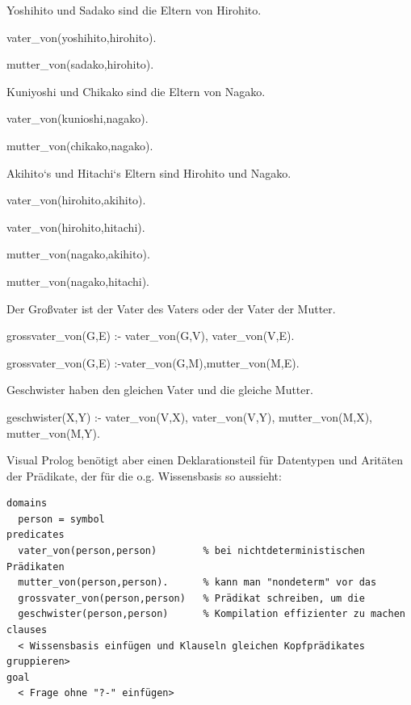 \documentclass[a4paper]{article}
\begin{document}
\begin{multicols}{3}
  \begin{itemize*}
    \itemsep1pt\parskip0pt
    \item
          Yoshihito und Sadako sind die Eltern von Hirohito.
    \item
          vater\_von(yoshihito,hirohito).
    \item
          mutter\_von(sadako,hirohito).
    \item
          Kuniyoshi und Chikako sind die Eltern von Nagako.
    \item
          vater\_von(kunioshi,nagako).
    \item
          mutter\_von(chikako,nagako).
    \item
          Akihito`s und Hitachi`s Eltern sind Hirohito und Nagako.
    \item
          vater\_von(hirohito,akihito).
    \item
          vater\_von(hirohito,hitachi).
    \item
          mutter\_von(nagako,akihito).
    \item
          mutter\_von(nagako,hitachi).
    \item
          Der Großvater ist der Vater des Vaters oder der Vater der Mutter.
    \item
          grossvater\_von(G,E) :- vater\_von(G,V), vater\_von(V,E).
    \item
          grossvater\_von(G,E) :-vater\_von(G,M),mutter\_von(M,E).
    \item
          Geschwister haben den gleichen Vater und die gleiche Mutter.
    \item
          geschwister(X,Y) :- vater\_von(V,X), vater\_von(V,Y),
          mutter\_von(M,X), mutter\_von(M,Y).
  \end{itemize*}

  Visual Prolog benötigt aber einen Deklarationsteil für Datentypen und
  Aritäten der Prädikate, der für die o.g. Wissensbasis so aussieht:

  \begin{verbatim}
domains
  person = symbol
predicates
  vater_von(person,person)        % bei nichtdeterministischen Prädikaten
  mutter_von(person,person).      % kann man "nondeterm" vor das
  grossvater_von(person,person)   % Prädikat schreiben, um die
  geschwister(person,person)      % Kompilation effizienter zu machen
clauses
  < Wissensbasis einfügen und Klauseln gleichen Kopfprädikates gruppieren>
goal
  < Frage ohne "?-" einfügen>
\end{verbatim}


\end{multicols}
\end{document}
